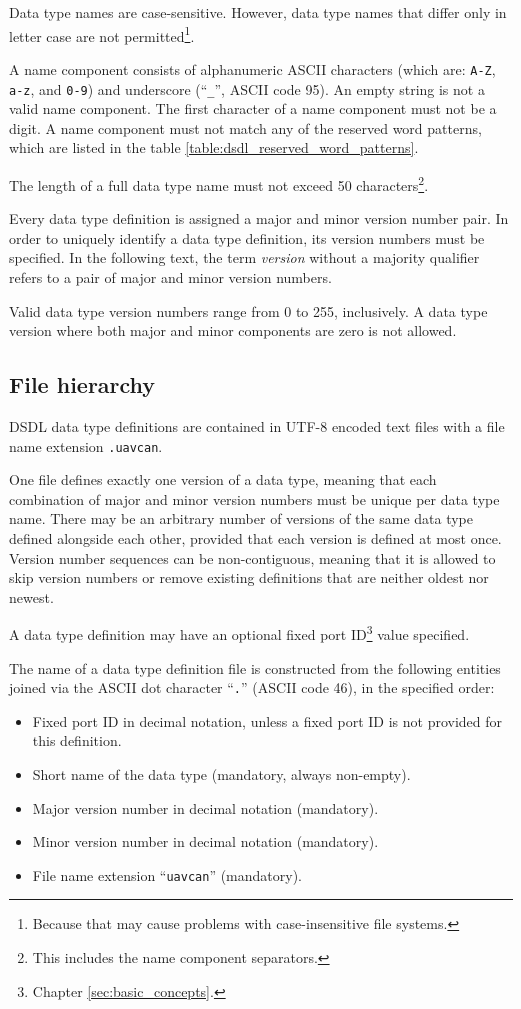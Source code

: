 Data type names are case-sensitive.
However, data type names that differ only in letter case are not permitted\footnote{%
Because that may cause problems with case-insensitive file systems.}.

A name component consists of alphanumeric ASCII characters (which are: \verb|A-Z|, \verb|a-z|, and \verb|0-9|)
and underscore (``\verb|_|'', ASCII code 95).
An empty string is not a valid name component.
The first character of a name component must not be a digit.
A name component must not match any of the reserved word patterns,
which are listed in the table \ref{table:dsdl_reserved_word_patterns}.

The length of a full data type name must not exceed 50
characters\footnote{This includes the name component separators.}.

Every data type definition is assigned a major and minor version number pair.
In order to uniquely identify a data type definition, its version numbers must be specified.
In the following text, the term \emph{version} without a majority qualifier refers to
a pair of major and minor version numbers.

Valid data type version numbers range from 0 to 255, inclusively.
A data type version where both major and minor components are zero is not allowed.

\subsection{File hierarchy}

DSDL data type definitions are contained in UTF-8 encoded text files with a file name extension \verb|.uavcan|.

One file defines exactly one version of a data type,
meaning that each combination of major and minor version numbers must be unique per data type name.
There may be an arbitrary number of versions of the same data type defined alongside each other,
provided that each version is defined at most once.
Version number sequences can be non-contiguous,
meaning that it is allowed to skip version numbers or remove existing definitions that are neither oldest nor newest.

A data type definition may have an optional fixed port ID\footnote{Chapter \ref{sec:basic_concepts}.} value specified.

The name of a data type definition file is constructed from the following entities
joined via the ASCII dot character ``\verb|.|'' (ASCII code 46), in the specified order:
\begin{itemize}
    \item Fixed port ID in decimal notation, unless a fixed port ID is not provided for this definition.
    \item Short name of the data type (mandatory, always non-empty).
    \item Major version number in decimal notation (mandatory).
    \item Minor version number in decimal notation (mandatory).
    \item File name extension ``\verb|uavcan|'' (mandatory).
\end{itemize}

